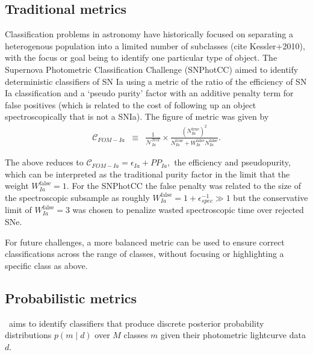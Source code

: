 \subsection{Traditional metrics}
\label{sec:past}

Classification problems in astronomy have historically focused on separating a heterogenous population into a limited number of subclasses (cite Kessler+2010), with the focus or goal being to identify one particular type of object.
The Supernova Photometric Classification Challenge (SNPhotCC) aimed to identify deterministic classifiers of SN Ia using a metric of the ratio of the efficiency of SN Ia classification and a `pseudo purity' factor with an additive penalty term for false positives (which is related to the cost of following up an object spectroscopically that is not a SNIa).
The figure of metric was given by
\begin{eqnarray}
  \label{eq:snphotcc}
  \mathcal{C}_{FOM-Ia} &\equiv& \frac{1}{\mathcal{N}_{Ia}^{TOT}}\times \frac{(N_{Ia}^{\mathrm{true}})^2}{N_{Ia}^\mathrm{true}+W_{Ia}^\mathrm{false}N_{Ia}^\mathrm{false}}.
\end{eqnarray}

The above reduces to $\mathcal{C}_{FOM-Ia}  = \epsilon_{Ia} + PP_{Ia},$ the efficiency and pseudopurity, which can be interpreted as the traditional purity factor in the limit that the weight $W_{Ia}^\mathrm{false} = 1$.
For the SNPhotCC the false penalty was related to the size of the spectroscopic subsample as roughly $W_{Ia}^\mathrm{false} = 1 + \epsilon_{spec}^{-1} \gg 1$ but the conservative limit of $W_{Ia}^\mathrm{false} = 3$ was chosen to penalize wasted spectroscopic time over rejected SNe.

For future challenges, a more balanced metric can be used to ensure correct classifications across the range of classes, without focusing or highlighting a specific class as above.

\subsection{Probabilistic metrics}
\label{sec:metrics}

\plasticc\ aims to identify classifiers that produce discrete posterior probability distributions $p(m \mid d)$ over $M$ classes $m$ given their photometric lightcurve data $d$.

